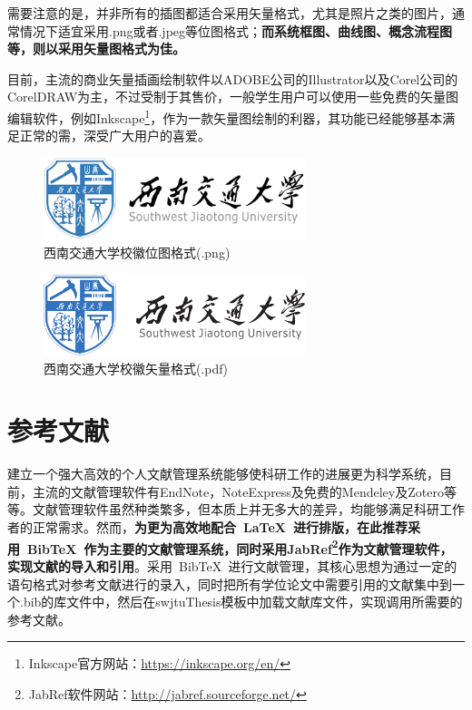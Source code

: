 \par
需要注意的是，并非所有的插图都适合采用矢量格式，尤其是照片之类的图片，通常情况下适宜采用.png或者.jpeg等位图格式；\textbf{而系统框图、曲线图、概念流程图等，则以采用矢量图格式为佳。}

\par
目前，主流的商业矢量插画绘制软件以ADOBE公司的Illustrator以及Corel公司的CorelDRAW为主，不过受制于其售价，一般学生用户可以使用一些免费的矢量图编辑软件，例如Inkscape\footnote{Inkscape官方网站：\url{https://inkscape.org/en/}}，作为一款矢量图绘制的利器，其功能已经能够基本满足正常的需，深受广大用户的喜爱。

\begin{figure}[htbp]
	\centering
	\includegraphics[width=3in]{figures/SWJTU_LOGO.png}
	\caption{西南交通大学校徽位图格式(.png)}
	\label{SWJTU_LOGO_PNG}
\end{figure}

\begin{figure}[htbp]
	\centering
	\includegraphics[width=3in]{figures/SWJTU_LOGO.pdf}
	\caption{西南交通大学校徽矢量格式(.pdf)}
	\label{SWJTU_LOGO_PDF}
\end{figure}



\section{参考文献}
建立一个强大高效的个人文献管理系统能够使科研工作的进展更为科学系统，目前，主流的文献管理软件有EndNote，NoteExpress及免费的Mendeley及Zotero等等。文献管理软件虽然种类繁多，但本质上并无多大的差异，均能够满足科研工作者的正常需求。然而，\textbf{为更为高效地配合~\LaTeX{}~进行排版，在此推荐采用~BibTeX{}~作为主要的文献管理系统，同时采用JabRef\footnote{JabRef软件网站：\url{http://jabref.sourceforge.net/}}作为文献管理软件，实现文献的导入和引用}。采用~BibTeX{}~进行文献管理，其核心思想为通过一定的语句格式对参考文献进行的录入，同时把所有学位论文中需要引用的文献集中到一个.bib的库文件中，然后在swjtuThesis模板中加载文献库文件，实现调用所需要的参考文献。


